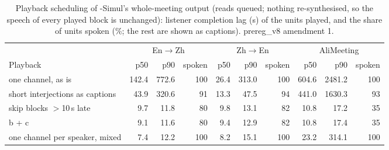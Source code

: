 \begin{table}[t]
\centering\small
\begin{tabular}{lrrrrrrrrr}
\toprule
 & \multicolumn{3}{c}{En$\rightarrow$Zh} & \multicolumn{3}{c}{Zh$\rightarrow$En} & \multicolumn{3}{c}{AliMeeting} \\
\cmidrule(lr){2-4}\cmidrule(lr){5-7}\cmidrule(lr){8-10}
Playback & p50 & p90 & spoken & p50 & p90 & spoken & p50 & p90 & spoken \\
\midrule
one channel, as is & 142.4 & 772.6 & 100 & 26.4 & 313.0 & 100 & 604.6 & 2481.2 & 100 \\
short interjections as captions & 43.9 & 320.6 & 91 & 13.3 & 47.5 & 94 & 441.0 & 1630.3 & 93 \\
skip blocks $>$10\,s late & 9.7 & 11.8 & 80 & 9.8 & 13.1 & 82 & 10.8 & 17.2 & 35 \\
b + c & 9.1 & 11.6 & 80 & 9.4 & 12.9 & 82 & 10.8 & 17.4 & 35 \\
one channel per speaker, mixed & 7.4 & 12.2 & 100 & 8.2 & 15.1 & 100 & 23.2 & 314.1 & 100 \\
\bottomrule
\end{tabular}
\caption{Playback scheduling of \sys{}-Simul's whole-meeting output (reads queued; nothing re-synthesised, so the speech
of every played block is unchanged): listener completion lag (s) of the units played, and the share of units spoken
(\%; the rest are shown as captions). prereg\_v8 amendment 1.}
\label{tab:sched8}
\end{table}
